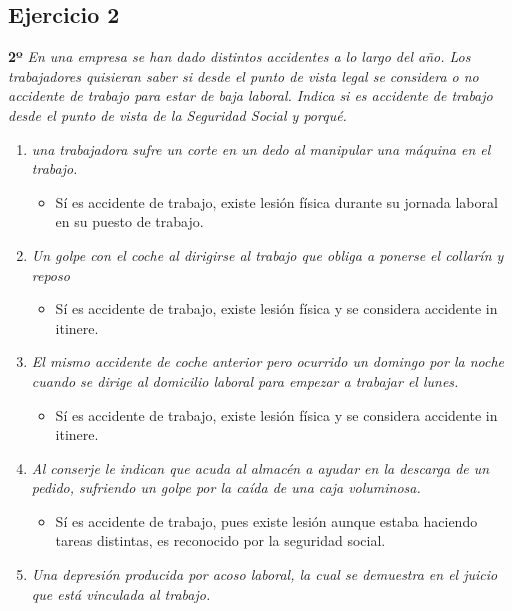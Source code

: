 \documentclass{article}
\begin{document}
      \subsection{Ejercicio 2}
        \textbf{2º} \textit{En una empresa se han dado distintos accidentes a lo largo del año. Los trabajadores quisieran saber si desde el 
        punto de vista legal se considera o no accidente de trabajo para estar de baja laboral. Indica si es accidente de trabajo desde el 
        punto de vista de la Seguridad Social y porqué.}
        \\
        \begin{enumerate}[label=(\alph*)]
          \item \textit{una trabajadora sufre un corte en un dedo al manipular una máquina en el trabajo.}
            \begin{itemize}
              \item Sí es accidente de trabajo, existe lesión física durante su jornada laboral en su puesto de trabajo.
            \end{itemize}
          \item \textit{Un golpe con el coche al dirigirse al trabajo que obliga a ponerse el collarín y reposo}
            \begin{itemize}
              \item Sí es accidente de trabajo, existe lesión física y se considera accidente in itinere.
            \end{itemize}
          \item \textit{El mismo accidente de coche anterior pero ocurrido un domingo por la noche cuando se dirige al domicilio laboral para empezar a trabajar el lunes.}
            \begin{itemize}
              \item Sí es accidente de trabajo, existe lesión física y se considera accidente in itinere.
            \end{itemize}
          \item \textit{Al conserje le indican que acuda al almacén a ayudar en la descarga de un pedido, sufriendo un golpe por la caída de una caja voluminosa.}
            \begin{itemize}
              \item Sí es accidente de trabajo, pues existe lesión aunque estaba haciendo tareas distintas, es reconocido por la seguridad social.
            \end{itemize}
          \item \textit{Una depresión producida por acoso laboral, la cual se demuestra en el juicio que está vinculada al trabajo.}

\end{enumerate}
\end{document}
